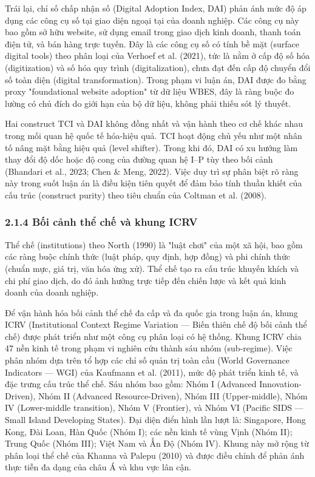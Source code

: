 \documentclass[12pt,a4paper]{article}
\begin{document}
Trái lại, chỉ số chấp nhận số (Digital Adoption Index, DAI) phản ánh mức
độ áp dụng các công cụ số tại giao diện ngoại tại của doanh nghiệp. Các
công cụ này bao gồm sở hữu website, sử dụng email trong giao dịch kinh
doanh, thanh toán điện tử, và bán hàng trực tuyến. Đây là các công cụ số
có tính bề mặt (surface digital tools) theo phân loại của Verhoef et al.
(2021), tức là nằm ở cấp độ số hóa (digitization) và số hóa quy trình
(digitalization), chưa đạt đến cấp độ chuyển đổi số toàn diện (digital
transformation). Trong phạm vi luận án, DAI được đo bằng proxy
"foundational website adoption" từ dữ liệu WBES, đây là ràng buộc đo
lường có chủ đích do giới hạn của bộ dữ liệu, không phải thiếu sót lý
thuyết.

Hai construct TCI và DAI không đồng nhất và vận hành theo cơ chế khác
nhau trong mối quan hệ quốc tế hóa-hiệu quả. TCI hoạt động chủ yếu như
một nhân tố nâng mặt bằng hiệu quả (level shifter). Trong khi đó, DAI có
xu hướng làm thay đổi độ dốc hoặc độ cong của đường quan hệ I--P tùy
theo bối cảnh (Bhandari et al., 2023; Chen \& Meng, 2022). Việc duy trì
sự phân biệt rõ ràng này trong suốt luận án là điều kiện tiên quyết để
đảm bảo tính thuần khiết của cấu trúc (construct purity) theo tiêu chuẩn
của Coltman et al. (2008).

\hypertarget{214-bux1ed1i-cux1ea3nh-thux1ec3-chux1ebf-vuxe0-khung-icrv}{%
\subsubsection{2.1.4 Bối cảnh thể chế và khung
ICRV}\label{214-bux1ed1i-cux1ea3nh-thux1ec3-chux1ebf-vuxe0-khung-icrv}}

Thể chế (institutions) theo North (1990) là "luật chơi" của một xã hội,
bao gồm các ràng buộc chính thức (luật pháp, quy định, hợp đồng) và phi
chính thức (chuẩn mực, giá trị, văn hóa ứng xử). Thể chế tạo ra cấu trúc
khuyến khích và chi phí giao dịch, do đó ảnh hưởng trực tiếp đến chiến
lược và kết quả kinh doanh của doanh nghiệp.

Để vận hành hóa bối cảnh thể chế đa cấp và đa quốc gia trong luận án,
khung ICRV (Institutional Context Regime Variation --- Biến thiên chế độ
bối cảnh thể chế) được phát triển như một công cụ phân loại có hệ thống.
Khung ICRV chia 47 nền kinh tế trong phạm vi nghiên cứu thành sáu nhóm
(sub-regime). Việc phân nhóm dựa trên tổ hợp các chỉ số quản trị toàn
cầu (World Governance Indicators --- WGI) của Kaufmann et al. (2011),
mức độ phát triển kinh tế, và đặc trưng cấu trúc thể chế. Sáu nhóm bao
gồm: Nhóm I (Advanced Innovation-Driven), Nhóm II (Advanced
Resource-Driven), Nhóm III (Upper-middle), Nhóm IV (Lower-middle
transition), Nhóm V (Frontier), và Nhóm VI (Pacific SIDS --- Small
Island Developing States). Đại diện điển hình lần lượt là: Singapore,
Hong Kong, Đài Loan, Hàn Quốc (Nhóm I); các nền kinh tế vùng Vịnh (Nhóm
II); Trung Quốc (Nhóm III); Việt Nam và Ấn Độ (Nhóm IV). Khung này mở
rộng từ phân loại thể chế của Khanna và Palepu (2010) và được điều chỉnh
để phản ánh thực tiễn đa dạng của châu Á và khu vực lân cận.
\end{document}
